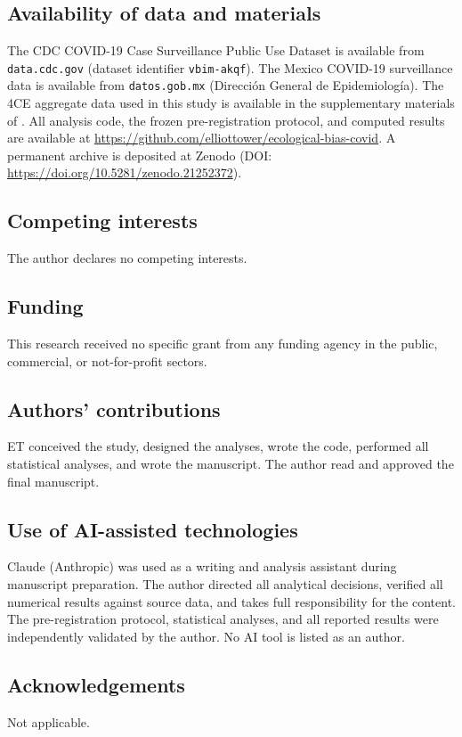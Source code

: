 \documentclass[11pt]{article}
\begin{document}
\subsection*{Availability of data and materials}
The CDC COVID-19 Case Surveillance Public Use Dataset is available from
\texttt{data.cdc.gov} (dataset identifier \texttt{vbim-akqf}).  The
Mexico COVID-19 surveillance data is available from \texttt{datos.gob.mx}
(Direcci\'{o}n General de Epidemiolog\'{i}a).  The 4CE aggregate data
used in this study is available in the supplementary materials of
\cite{four_ce_neuro2021}.  All analysis code, the frozen
pre-registration protocol, and computed results are available at
\url{https://github.com/elliottower/ecological-bias-covid}.
A permanent archive is deposited at Zenodo
(DOI: \url{https://doi.org/10.5281/zenodo.21252372}).

\subsection*{Competing interests}
The author declares no competing interests.

\subsection*{Funding}
This research received no specific grant from any funding agency in the
public, commercial, or not-for-profit sectors.

\subsection*{Authors' contributions}
ET conceived the study, designed the analyses, wrote the code, performed
all statistical analyses, and wrote the manuscript.  The author read and
approved the final manuscript.

\subsection*{Use of AI-assisted technologies}
Claude (Anthropic) was used as a writing and analysis assistant during
manuscript preparation.  The author directed all analytical decisions,
verified all numerical results against source data, and takes full
responsibility for the content.  The pre-registration protocol,
statistical analyses, and all reported results were independently
validated by the author.  No AI tool is listed as an author.

\subsection*{Acknowledgements}
Not applicable.



\end{document}
